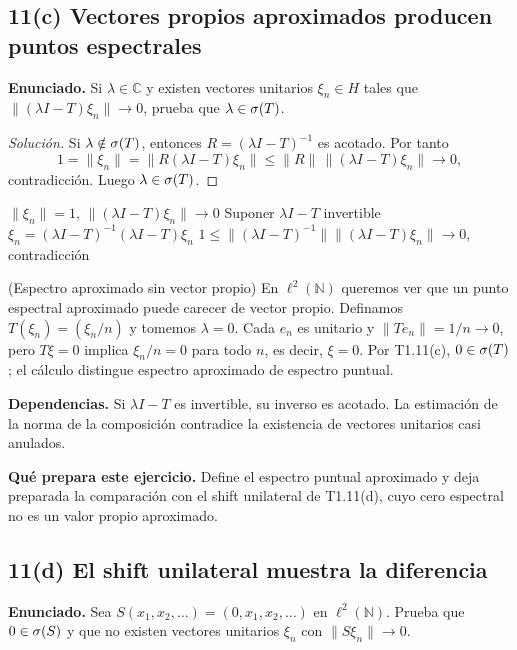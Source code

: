 \subsection*{11(c) Vectores propios aproximados producen puntos espectrales}

\noindent\textbf{Enunciado.} Si $\lambda\in\mathbb C$ y existen vectores unitarios $\xi_n\in H$ tales que $\|(\lambda I-T)\xi_n\|\to0$, prueba que $\lambda\in\sigma(T)$.

\begin{proof}[Solución]
Si $\lambda\notin\sigma(T)$, entonces $R=(\lambda I-T)^{-1}$ es acotado. Por tanto
\[
1=\|\xi_n\|=\|R(\lambda I-T)\xi_n\|
\le\|R\|\,\|(\lambda I-T)\xi_n\|\to0,
\]
contradicción. Luego $\lambda\in\sigma(T)$.
\end{proof}

\proofdiagram
{$\|\xi_n\|=1$, $\|(\lambda I-T)\xi_n\|\to0$}
{Suponer $\lambda I-T$ invertible}
{$\xi_n=(\lambda I-T)^{-1}(\lambda I-T)\xi_n$}
{$1\le\|(\lambda I-T)^{-1}\|\|(\lambda I-T)\xi_n\|\to0$, contradicción}

\begin{cthejemplo}{(Espectro aproximado sin vector propio)}
En $\ell^2(\mathbb N)$ queremos ver que un punto espectral aproximado puede carecer de
vector propio. Definamos $T(\xi_n)=(\xi_n/n)$ y tomemos $\lambda=0$.
Cada $e_n$ es unitario y $\|Te_n\|=1/n\to0$, pero $T\xi=0$ implica
$\xi_n/n=0$ para todo $n$, es decir, $\xi=0$.
Por T1.11(c), $0\in\sigma(T)$; el cálculo distingue espectro aproximado de espectro puntual.
\end{cthejemplo}

\noindent\textbf{Dependencias.} Si $\lambda I-T$ es invertible, su inverso es acotado. La estimación de la norma de la composición contradice la existencia de vectores unitarios casi anulados.

\noindent\textbf{Qué prepara este ejercicio.} Define el espectro puntual aproximado y deja preparada la comparación con el shift unilateral de T1.11(d), cuyo cero espectral no es un valor propio aproximado.

\subsection*{11(d) El shift unilateral muestra la diferencia}

\noindent\textbf{Enunciado.} Sea $S(x_1,x_2,\ldots)=(0,x_1,x_2,\ldots)$ en
$\ell^2(\mathbb N)$. Prueba que $0\in\sigma(S)$ y que no existen vectores unitarios
$\xi_n$ con $\|S\xi_n\|\to0$.


